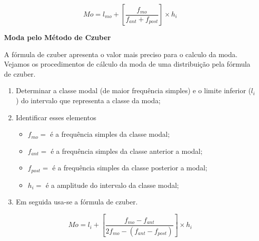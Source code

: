 \begin{equation}\label{}
    Mo=l_{mo}+\left[\frac{f_{mo}}{f_{ant}+f_{post}}\right]\times h_{i}
\end{equation}



\textbf{Moda pelo Método de Czuber}
\vskip0.3cm

A fórmula de czuber apresenta o valor mais preciso para o calculo da moda. Vejamos os procedimentos
de cálculo da moda de uma distribuição pela fórmula de czuber.


\begin{enumerate}
\item [{1°)}] Determinar a classe modal (de maior frequência simples) e o limite inferior ($l_{i}$) do intervalo que representa a classe da moda;
\item [{2°)}] Identificar esses elementos
\begin{itemize}
   \item $f_{mo}=$ é a frequência simples da classe modal;
   \item $f_{ant}=$ é a frequência simples da classe anterior a modal;
   \item $f_{post}=$ é a frequência simples da classe posterior a modal;
   \item $h_{i}=$ é a amplitude do intervalo da classe modal;
 \end{itemize}
\item [{4°)}] Em seguida usa-se a fórmula de czuber.
\end{enumerate}

\begin{equation}\label{}
    Mo=l_{i}+\left[\frac{f_{mo}-f_{ant}}{2f_{mo}-(f_{ant}-f_{post})}\right]\times h_{i}
\end{equation}



